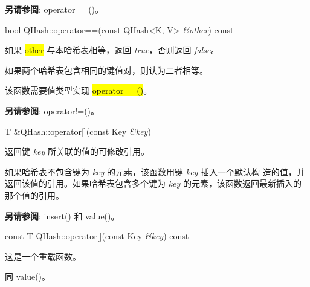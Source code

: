 \textbf{另请参阅}: operator==()。

bool QHash::operator==(const QHash<K, V> \emph{\&other}) const

如果 \hl{other} 与本哈希表相等，返回 \emph{true}，否则返回 \emph{false}。

如果两个哈希表包含相同的键值对，则认为二者相等。

该函数需要值类型实现 \hl{operator==()}。

\textbf{另请参阅}: operator!=()。

T \&QHash::operator[](const Key \emph{\&key})

返回键 \emph{key} 所关联的值的可修改引用。

如果哈希表不包含键为 \emph{key} 的元素，该函数用键 \emph{key} 插入一个默认构
造的值，并返回该值的引用。如果哈希表包含多个键为 \emph{key} 的元素，该函数返回最新插入的那个值的引用。

\textbf{另请参阅}: insert() 和 value()。

const T QHash::operator[](const Key \emph{\&key}) const

这是一个重载函数。

同 value()。


